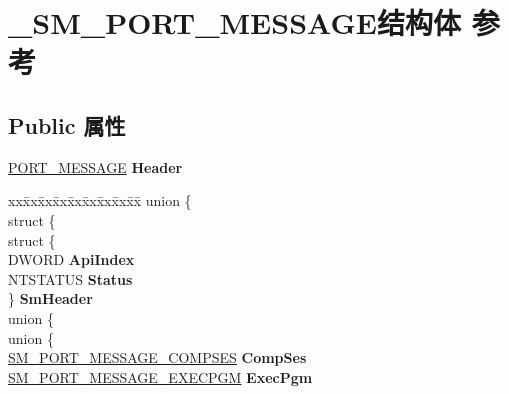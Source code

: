 \hypertarget{struct___s_m___p_o_r_t___m_e_s_s_a_g_e}{}\section{\+\_\+\+S\+M\+\_\+\+P\+O\+R\+T\+\_\+\+M\+E\+S\+S\+A\+G\+E结构体 参考}
\label{struct___s_m___p_o_r_t___m_e_s_s_a_g_e}
\subsection*{Public 属性}
\begin{DoxyCompactItemize}
\item 
\mbox{\label{struct___s_m___p_o_r_t___m_e_s_s_a_g_e_ab6bef4917403781a7c5ef147679a9828}} 
\hyperlink{struct___p_o_r_t___m_e_s_s_a_g_e___h_e_a_d_e_r}{P\+O\+R\+T\+\_\+\+M\+E\+S\+S\+A\+GE} {\bfseries Header}
\item 
\mbox{\label{struct___s_m___p_o_r_t___m_e_s_s_a_g_e_a55b788010bff70a77e531fa50c612cf2}} 
\begin{tabbing}
xx\=xx\=xx\=xx\=xx\=xx\=xx\=xx\=xx\=\kill
union \{\\
\mbox{\label{union___s_m___p_o_r_t___m_e_s_s_a_g_e_1_1_0D3030_ac6d5055164eb4020b76ad3828404f895}} 
\>struct \{\\
\>\>struct \{\\
\>\>\>DWORD {\bfseries ApiIndex}\\
\>\>\>NTSTATUS {\bfseries Status}\\
\>\>\} {\bfseries SmHeader}\\
\mbox{\label{struct___s_m___p_o_r_t___m_e_s_s_a_g_e_1_1_0D3030_1_1_0D3032_afa54cc160197d43a23a443fd7ec53838}} 
\>\>union \{\\
\>\>\>union \{\\
\>\>\>\>\hyperlink{struct___s_m___p_o_r_t___m_e_s_s_a_g_e___c_o_m_p_s_e_s}{SM\_PORT\_MESSAGE\_COMPSES} {\bfseries CompSes}\\
\>\>\>\>\hyperlink{struct___s_m___p_o_r_t___m_e_s_s_a_g_e___e_x_e_c_p_g_m}{SM\_PORT\_MESSAGE\_EXECPGM} {\bfseries ExecPgm}\\

\end{tabbing}
\end{DoxyCompactItemize}
